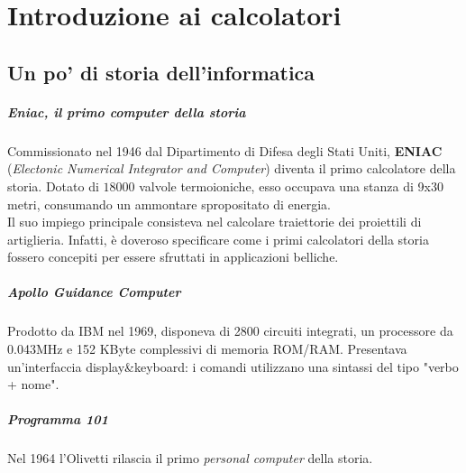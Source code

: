 \chapter{Introduzione ai calcolatori}

\section{Un po' di storia dell'informatica}
\paragraph{Eniac, il primo computer della storia}
Commissionato nel 1946 dal Dipartimento di Difesa degli Stati Uniti, \textbf{ENIAC} (\textit{Electonic Numerical Integrator and Computer}) diventa il primo calcolatore della storia.
Dotato di $18000$ valvole termoioniche, esso occupava una stanza di 9x30 metri, consumando un ammontare spropositato di energia.\\
Il suo impiego principale consisteva nel calcolare traiettorie dei proiettili di artiglieria. Infatti, è doveroso specificare come i primi calcolatori della storia fossero concepiti per essere sfruttati in applicazioni belliche.

\paragraph{Apollo Guidance Computer}
Prodotto da IBM nel 1969, disponeva di 2800 circuiti integrati, un processore da 0.043MHz e 152 KByte complessivi di memoria ROM/RAM. Presentava un'interfaccia display\&keyboard: i comandi utilizzano una sintassi del tipo "verbo + nome".

\paragraph{Programma 101} Nel 1964 l'Olivetti rilascia il primo \textit{personal computer} della storia.

